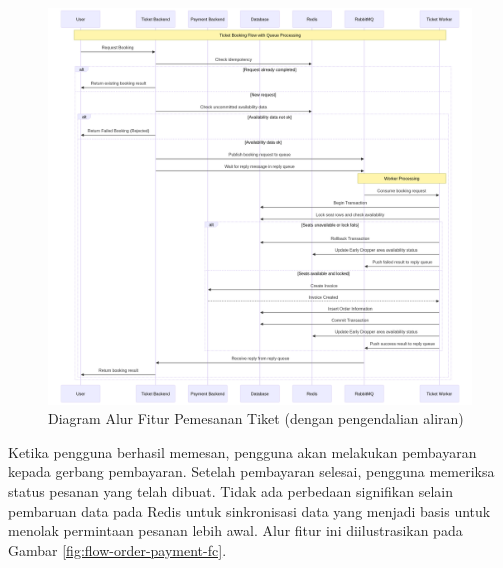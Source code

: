 \begin{figure}[H]
    \centering
    \includegraphics[width=1\textwidth]{resources/chapter-3/book-async.png}
    \caption{Diagram Alur Fitur Pemesanan Tiket (dengan pengendalian aliran)}
    \label{fig:flow-book-fc}
\end{figure}

\pagebreak

Ketika pengguna berhasil memesan, pengguna akan melakukan pembayaran kepada gerbang pembayaran. Setelah pembayaran selesai, pengguna memeriksa status pesanan yang telah dibuat. Tidak ada perbedaan signifikan selain pembaruan data pada Redis untuk sinkronisasi data yang menjadi basis untuk menolak permintaan pesanan lebih awal. Alur fitur ini diilustrasikan pada Gambar \ref{fig:flow-order-payment-fc}.

